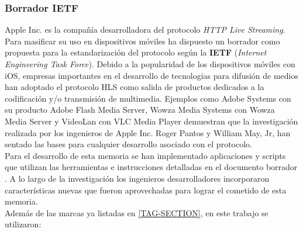 \subsubsection{Borrador IETF}
Apple Inc. es la compañía desarrolladora del protocolo \textit{HTTP Live Streaming}. Para masificar su uso en dispositivos móviles ha dispuesto un borrador \cite{apple-draftpantos}  
como propuesta para la estandarización del protocolo según la \textbf{IETF} (\textit{Internet Engineering Task Force}).
Debido a la popularidad de los dispositivos móviles con iOS, empresas importantes en el desarrollo de tecnologias para difusión de medios han adoptado el protocolo HLS como salida de productos dedicados a la codificación y/o transmisión de multimedia. Ejemplos como Adobe Systems con su producto Adobe Flash Media Server, Wowza Media Systems con Wowza Media Server y VideoLan con VLC Media Player demuestran que la investigación realizada por los ingenieros de Apple Inc. Roger Pantos y William May, Jr, han sentado las bases para cualquier desarrollo asociado con el protocolo.\\

Para el desarrollo de esta memoria se han implementado aplicaciones y scripts que utilizan las herramientas e instrucciones detalladas en el documento borrador \cite{apple-draftpantos}. A lo largo de la investigación los ingenieros desarrolladores incorporaron características nuevas que fueron aprovechadas para lograr el cometido de esta memoria.\\

Además de las marcas ya listadas en \ref{TAG-SECTION}, en este trabajo se utilizaron: 

